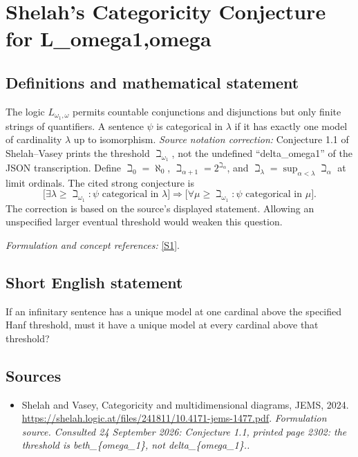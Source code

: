 \documentclass[11pt]{article}
\begin{document}
\section*{\texorpdfstring{Shelah's Categoricity Conjecture for L\_omega1,omega}{Shelah's Categoricity Conjecture for L\_omega1,omega}}\label{30006889}
\subsection{Definitions and mathematical statement}
The logic $L_{\omega_1,\omega}$ permits countable conjunctions and disjunctions but only finite strings of quantifiers. A sentence $\psi$ is categorical in $\lambda$ if it has exactly one model of cardinality $\lambda$ up to isomorphism. \emph{Source notation correction:} Conjecture 1.1 of Shelah--Vasey prints the threshold $\beth_{\omega_1}$, not the undefined ``delta\_omega1'' of the JSON transcription. Define $\beth_0=\aleph_0$, $\beth_{\alpha+1}=2^{\beth_\alpha}$, and $\beth_\lambda=\sup_{\alpha<\lambda}\beth_\alpha$ at limit ordinals. The cited strong conjecture is
\[
 \bigl[\exists\lambda\ge\beth_{\omega_1}:\psi\text{ categorical in }\lambda\bigr]
 \Longrightarrow
 \bigl[\forall\mu\ge\beth_{\omega_1}:\psi\text{ categorical in }\mu\bigr].
\]
The correction is based on the source's displayed statement. Allowing an unspecified larger eventual threshold would weaken this question.
\par\smallskip\textit{Formulation and concept references:} \href{https://shelah.logic.at/files/241811/10.4171-jems-1477.pdf}{[S1]}.

\subsection{Short English statement}
If an infinitary sentence has a unique model at one cardinal above the specified Hanf threshold, must it have a unique model at every cardinal above that threshold?
\subsection{Sources}
\begin{itemize}
\item[S1]Shelah and Vasey, Categoricity and multidimensional diagrams, JEMS, 2024.
\url{https://shelah.logic.at/files/241811/10.4171-jems-1477.pdf}.
\textit{Formulation source. Consulted 24 September 2026: Conjecture 1.1, printed page 2302: the threshold is beth\_\{omega\_1\}, not delta\_\{omega\_1\}..}
\end{itemize}
\end{document}
